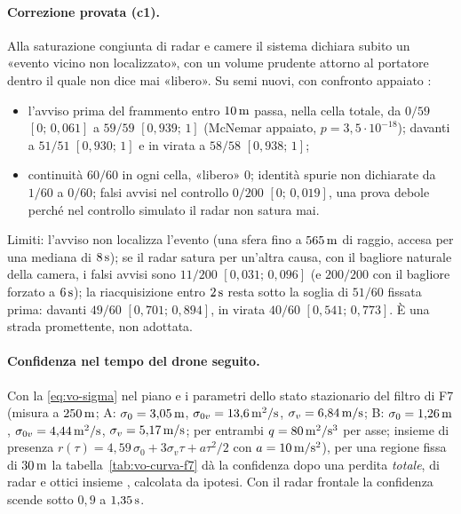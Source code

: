 \paragraph{Correzione provata (c1).} Alla saturazione congiunta di radar e camere il sistema dichiara subito un «evento vicino non localizzato», con un volume prudente attorno al portatore dentro il quale non dice mai «libero». Su semi nuovi, con confronto appaiato :
\begin{itemize}
\item l'avviso prima del frammento entro $10\,\mathrm{m}$ passa, nella cella totale, da $0/59$ $[0;\,0{,}061]$ a $59/59$ $[0{,}939;\,1]$ (McNemar appaiato, $p=3{,}5\cdot10^{-18}$); davanti a $51/51$ $[0{,}930;\,1]$ e in virata a $58/58$ $[0{,}938;\,1]$;
\item continuità $60/60$ in ogni cella, «libero» $0$; identità spurie non dichiarate da $1/60$ a $0/60$; falsi avvisi nel controllo $0/200$ $[0;\,0{,}019]$, una prova debole perché nel controllo simulato il radar non satura mai.
\end{itemize}
Limiti: l'avviso non localizza l'evento (una sfera fino a $565\,\mathrm{m}$ di raggio, accesa per una mediana di $8\,\mathrm{s}$); se il radar satura per un'altra causa, con il bagliore naturale della camera, i falsi avvisi sono $11/200$ $[0{,}031;\,0{,}096]$ (e $200/200$ con il bagliore forzato a $6\,\mathrm{s}$); la riacquisizione entro $2\,\mathrm{s}$ resta sotto la soglia di $51/60$ fissata prima: davanti $49/60$ $[0{,}701;\,0{,}894]$, in virata $40/60$ $[0{,}541;\,0{,}773]$. È una strada promettente, non adottata.

\paragraph{Confidenza nel tempo del drone seguito.} Con la \eqref{eq:vo-sigma} nel piano e i parametri dello stato stazionario del filtro di F7 (misura a $250\,\mathrm{m}$; A: $\sigma_0=3{,}05\,\mathrm{m}$, $\sigma_{0v}=13{,}6\,\mathrm{m^2/s}$, $\sigma_v=6{,}84\,\mathrm{m/s}$; B: $\sigma_0=1{,}26\,\mathrm{m}$, $\sigma_{0v}=4{,}44\,\mathrm{m^2/s}$, $\sigma_v=5{,}17\,\mathrm{m/s}$; per entrambi $q=80\,\mathrm{m^2/s^3}$ per asse; insieme di presenza $r(\tau)=4{,}59\,\sigma_0+3\sigma_v\tau+a\tau^2/2$ con $a=10\,\mathrm{m/s^2}$), per una regione fissa di $30\,\mathrm{m}$ la tabella~\ref{tab:vo-curva-f7} dà la confidenza dopo una perdita \emph{totale}, di radar e ottici insieme , calcolata da ipotesi. Con il radar frontale la confidenza scende sotto $0{,}9$ a $1{,}35\,\mathrm{s}$.

